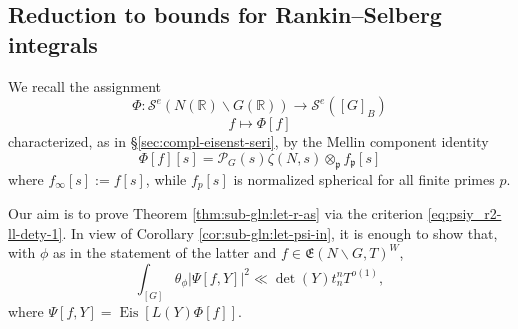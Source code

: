\documentclass[reqno]{amsart}
\DeclareMathOperator{\Eis}{Eis}
\theoremstyle{plain} \newtheorem{theorem} {Theorem}
\theoremstyle{definition} \newtheorem{definition} [theorem] {Definition}
\theoremstyle{itplain} %
\numberwithin{equation}{section}
\numberwithin{theorem}{section}
\begin{document}
\subsection{Reduction to bounds for Rankin--Selberg integrals}
We recall the assignment
\begin{equation*}
  \Phi : \mathcal{S}^e(N(\mathbb{R}) \backslash G(\mathbb{R})) \rightarrow \mathcal{S}^e([G]_B)
\end{equation*}
\begin{equation*}
  f \mapsto \Phi[f]
\end{equation*}
characterized, as in \S\ref{sec:compl-eisenst-seri}, by the Mellin component identity
\begin{equation}\label{eq:phif_-=-mathc}
  \Phi[f][s] = \mathcal{P}_G(s) \zeta(N,s) \otimes_{\mathfrak{p}} f_\mathfrak{p}[s]
\end{equation}
where $f_\infty[s] := f[s]$, while $f_p[s]$ is normalized spherical for all finite primes $p$.

Our aim is to prove Theorem \ref{thm:sub-gln:let-r-as} via the criterion \eqref{eq:psiy_r2-ll-dety-1}.  In view of Corollary \ref{cor:sub-gln:let-psi-in}, it is enough to show that, with $\phi$ as in the statement of the latter and $f \in \mathfrak{E}(N \backslash G, T)^W$,
\begin{equation}\label{eq:int_g-thet-psiy2}
  \int_{[G]}
  \theta_\phi \left\lvert \Psi[f,Y] \right\rvert^2 \ll
  \det(Y)
  t_n^n  T^{o(1)},
\end{equation}
where $\Psi[f,Y] = \Eis[L(Y) \Phi[f]]$.
\end{document}
